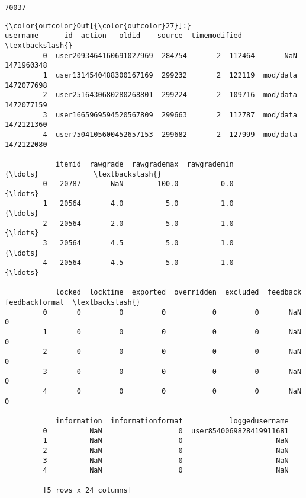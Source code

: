 \documentclass[11pt]{article}
\begin{document}
    \begin{Verbatim}[commandchars=\\\{\}]
70037

    \end{Verbatim}

\begin{Verbatim}[commandchars=\\\{\}]
{\color{outcolor}Out[{\color{outcolor}27}]:}                   username      id  action   oldid    source  timemodified  \textbackslash{}
         0  user2093464160691027969  284754       2  112464       NaN    1471960348   
         1  user1314540488300167169  299232       2  122119  mod/data    1472077698   
         2  user2516430680280268801  299224       2  109716  mod/data    1472077159   
         3  user1665969594520567809  299663       2  112787  mod/data    1472121360   
         4  user7504105600452657153  299682       2  127999  mod/data    1472122080   
         
            itemid  rawgrade  rawgrademax  rawgrademin           {\ldots}             \textbackslash{}
         0   20787       NaN        100.0          0.0           {\ldots}              
         1   20564       4.0          5.0          1.0           {\ldots}              
         2   20564       2.0          5.0          1.0           {\ldots}              
         3   20564       4.5          5.0          1.0           {\ldots}              
         4   20564       4.5          5.0          1.0           {\ldots}              
         
            locked  locktime  exported  overridden  excluded  feedback  feedbackformat  \textbackslash{}
         0       0         0         0           0         0       NaN               0   
         1       0         0         0           0         0       NaN               0   
         2       0         0         0           0         0       NaN               0   
         3       0         0         0           0         0       NaN               0   
         4       0         0         0           0         0       NaN               0   
         
            information  informationformat           loggedusername  
         0          NaN                  0  user8540069828419911681  
         1          NaN                  0                      NaN  
         2          NaN                  0                      NaN  
         3          NaN                  0                      NaN  
         4          NaN                  0                      NaN  
         
         [5 rows x 24 columns]
\end{Verbatim}
            
\end{document}
